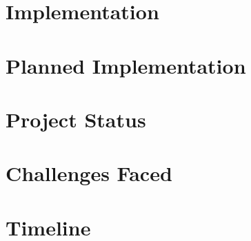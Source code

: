 \documentclass{article}
\begin{document}
\section{Implementation}


\section{Planned Implementation}


\section{Project Status}


\section{Challenges Faced}


\section{Timeline}

\end{document}

